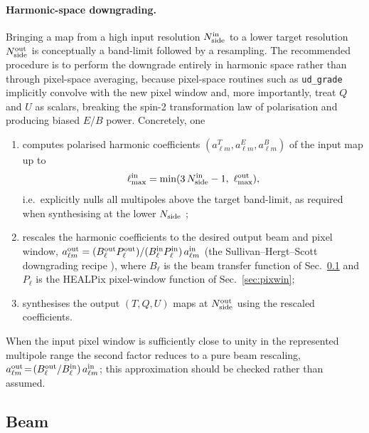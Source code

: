 \documentclass[11pt]{article}
\theoremstyle{definition}
\begin{document}
\paragraph{Harmonic-space downgrading.} Bringing a map from a high input resolution \(N_{\rm side}^{\rm in}\) to a lower target resolution \(N_{\rm side}^{\rm out}\) is conceptually a band-limit followed by a resampling. The recommended procedure \cite{sullivan2024methods} is to perform the downgrade entirely in harmonic space rather than through pixel-space averaging, because pixel-space routines such as \texttt{ud\_grade} implicitly convolve with the new pixel window and, more importantly, treat \(Q\) and \(U\) as scalars, breaking the spin-2 transformation law of polarisation and producing biased \(E\)/\(B\) power. Concretely, one
\begin{enumerate}[leftmargin=2.0em]
  \item computes polarised harmonic coefficients \((a_{\ell m}^T,a_{\ell m}^E,a_{\ell m}^B)\) of the input map up to
  \begin{equation}
    \ell_{\max}^{\rm in} = \min(3\,N_{\rm side}^{\rm in}-1,\ \ell_{\max}^{\rm out}),
  \end{equation}
  i.e.~explicitly nulls all multipoles above the target band-limit, as required when synthesising at the lower \(N_{\rm side}\) \cite{sullivan2024methods};
  \item rescales the harmonic coefficients to the desired output beam and pixel window, $a_{\ell m}^{\rm out} = (B_\ell^{\rm out}P_\ell^{\rm out})/(B_\ell^{\rm in}P_\ell^{\rm in})\,a_{\ell m}^{\rm in}$ (the Sullivan--Hergt--Scott downgrading recipe \cite{sullivan2024methods}), where \(B_\ell\) is the beam transfer function of Sec.~\ref{sec:beam} and \(P_\ell\) is the HEALPix pixel-window function of Sec.~\ref{sec:pixwin};
  \item synthesises the output \((T,Q,U)\) maps at \(N_{\rm side}^{\rm out}\) using the rescaled coefficients.
\end{enumerate}
When the input pixel window is sufficiently close to unity in the represented multipole range the second factor reduces to a pure beam rescaling, $a_{\ell m}^{\rm out}\!=\!(B_\ell^{\rm out}/B_\ell^{\rm in})\,a_{\ell m}^{\rm in}$; this approximation should be checked rather than assumed.



\subsection{Beam}
\label{sec:beam}
\end{document}

